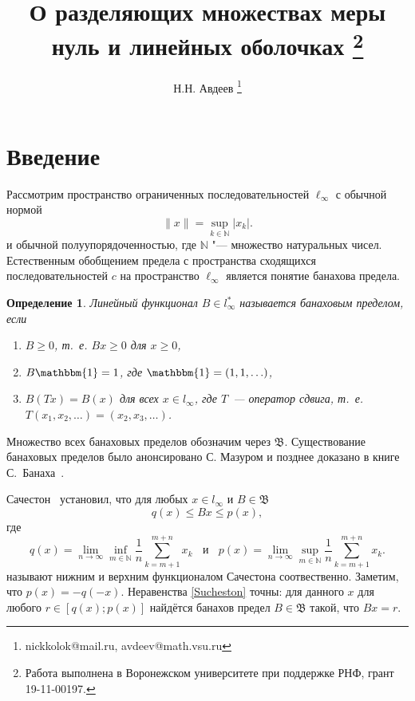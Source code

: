\documentclass[a4paper,14pt]{article} %
\theoremstyle{plain}
\newtheorem{definition}[lemma]{Определение}
\begin{document}

\title{
	О разделяющих множествах меры нуль и линейных оболочках
	\footnote{
		Работа выполнена в Воронежском университете при поддержке РНФ, грант 19-11-00197.
	}
}

\author{
	Н.Н. Авдеев
	\footnote{nickkolok@mail.ru, avdeev@math.vsu.ru}
}

\maketitle

\section{Введение}

Рассмотрим пространство ограниченных последовательностей $\ell_\infty$ с обычной нормой
\begin{equation*}
	\|x\| = \sup_{k\in\mathbb{N}} |x_k|
	.
\end{equation*}
и обычной полуупорядоченностью, где $\mathbb{N}$ "--- множество натуральных чисел.
Естественным обобщением предела с пространства сходящихся последовательностей $c$ на пространство $\ell_\infty$
является понятие банахова предела.


\begin{definition}
	Линейный функционал $B\in l_\infty^*$ называется банаховым пределом,
	если
	\begin{enumerate}
		\item
			$B\geq0$, т.~е. $Bx \geq 0$ для $x \geq 0$,
		\item
			$B\mathbbm{1}=1$, где $\mathbbm{1} =(1,1,\ldots)$,
		\item
			$B(Tx)=B(x)$ для всех $x\in l_\infty$, где $T$~---
		оператор сдвига, т.~е. $T(x_1,x_2,\ldots)=(x_2,x_3,\ldots)$.
	\end{enumerate}
\end{definition}
Множество всех банаховых пределов обозначим через $\mathfrak{B}$.
Существование банаховых пределов было анонсировано С. Мазуром \cite{Mazur} и позднее доказано в книге С.~Банаха~\cite{B}. 


Сачестон~\cite{sucheston1967banach} установил, что
для любых $x\in l_\infty$ и $B\in\mathfrak{B}$
\begin{equation}\label{Sucheston}
	q(x) \leqslant Bx \leqslant p(x)
	,
\end{equation}
где
\begin{equation*}
	q(x) = \lim_{n\to\infty} \inf_{m\in\mathbb{N}}  \frac{1}{n} \sum_{k=m+1}^{m+n} x_k
	~~~~\mbox{и}~~~~
	p(x) = \lim_{n\to\infty} \sup_{m\in\mathbb{N}}  \frac{1}{n} \sum_{k=m+1}^{m+n} x_k
	.
\end{equation*}
называют нижним и верхним функционалом Сачестона соотвественно.
Заметим, что $p(x) = -q(-x)$.
Неравенства \eqref{Sucheston} точны:
для данного $x$ для любого $r\in[q(x); p(x)]$ найдётся банахов предел
$B\in\mathfrak{B}$ такой, что $Bx = r$.
\end{document}
